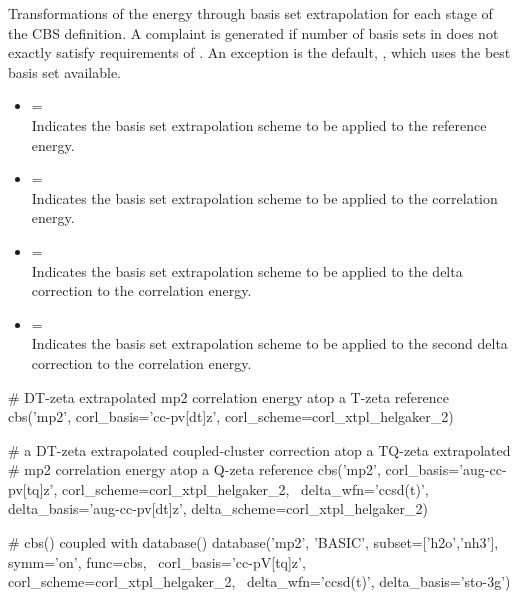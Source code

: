\begin{itemize}
Transformations of the energy through basis set extrapolation for each stage of the CBS definition.
A complaint is generated if number of basis sets in  does not exactly satisfy
requirements of .
An exception is the default, , which uses the best basis set available.
\begin{itemize}
\item[]  = \textit{} \textbar\;  \\
Indicates the basis set extrapolation scheme to be applied to the reference energy.
\item[]  = \textit{} \textbar\;  \\
Indicates the basis set extrapolation scheme to be applied to the correlation energy.
\item[]  = \textit{} \textbar\;  \\
Indicates the basis set extrapolation scheme to be applied to the delta correction to the correlation energy.
\item[]  = \textit{} \textbar\;  \\
Indicates the basis set extrapolation scheme to be applied to the second delta correction to the correlation energy.
\end{itemize}
\end{itemize}


\begin{Snippet}
# DT-zeta extrapolated mp2 correlation energy atop a T-zeta reference
cbs('mp2', corl_basis='cc-pv[dt]z', corl_scheme=corl_xtpl_helgaker_2)

# a DT-zeta extrapolated coupled-cluster correction atop a TQ-zeta extrapolated
#   mp2 correlation energy atop a Q-zeta reference
cbs('mp2', corl_basis='aug-cc-pv[tq]z', corl_scheme=corl_xtpl_helgaker_2, \
    delta_wfn='ccsd(t)', delta_basis='aug-cc-pv[dt]z', delta_scheme=corl_xtpl_helgaker_2)

# cbs() coupled with database()
database('mp2', 'BASIC', subset=['h2o','nh3'], symm='on', func=cbs, \
    corl_basis='cc-pV[tq]z', corl_scheme=corl_xtpl_helgaker_2, \
    delta_wfn='ccsd(t)', delta_basis='sto-3g')

\end{Snippet}

